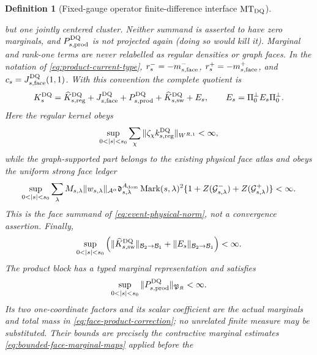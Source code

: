 \documentclass[11pt]{article}
\newtheorem{definition}[theorem]{Definition}
\newcommand{\cB}{\mathcal B}
\begin{document}
\begin{definition}[Fixed-gauge operator finite-difference interface
$\mathrm{MT}_{\rm DQ}$]
\begin{enumerate}[label=\textup{(MT\arabic*)}]
      but one jointly centered cluster.  Neither summand is asserted to have
      zero marginals, and $P_{s,\rm prod}^{\rm DQ}$ is not projected again
      (doing so would kill it).  Marginal and rank-one terms are never
      relabelled as regular densities or graph faces.  In the notation of
      \eqref{eq:product-current-type},
      $r_s^-=-m_{s,\rm face}^-$,
      $r_s^+=-m_{s,\rm face}^+$, and
      $c_s=J_{s,\rm face}^{\rm DQ}(1,1)$.  With this convention
      the complete quotient is
      \[
        K_s^{\rm DQ}=\widehat K_{s,\rm reg}^{\rm DQ}
          +J_{s,\rm face}^{\rm DQ}+P_{s,\rm prod}^{\rm DQ}
          +\widehat K_{s,\rm sw}^{\rm DQ}+E_s,
        \qquad E_s=\Pi_0^\perp E_s\Pi_0^\perp .
      \]
      Here the regular kernel obeys
      \begin{equation}
      \label{eq:uniform-gauge-DQ-regular}
       \sup_{0<|s|<s_0}\sum_\chi
       \|\zeta_\chi k_{s,\rm reg}^{\rm DQ}\|_{W^{R,1}}<\infty ,
      \end{equation}
      while the graph-supported part belongs to the existing physical face
      atlas and obeys the uniform strong face ledger
      \begin{equation}
      \label{eq:uniform-gauge-DQ-face}
       \sup_{0<|s|<s_0}\sum_{\lambda}M_{s,\lambda}
       \|w_{s,\lambda}\|_{\mathcal A^\alpha}
       \mathfrak d_{s,\lambda}^{A_{\rm dom}}
       \operatorname{Mark}(s,\lambda)^2
       \{1+Z(\mathcal G_{s,\lambda}^-)
              +Z(\mathcal G_{s,\lambda}^+)\}<\infty .
      \end{equation}
      This is the face summand of
      \eqref{eq:event-physical-norm}, not a convergence assertion.  Finally,
      \begin{equation}
      \label{eq:uniform-strong-weak-DQ}
       \sup_{0<|s|<s_0}
       \left(\|\widehat K_{s,\rm sw}^{\rm DQ}\|_{\cB_2\to\cB_1}
       +\|E_s\|_{\cB_2\to\cB_1}\right)<\infty.
      \end{equation}
      The product block has a typed marginal representation and satisfies
      \begin{equation}
      \label{eq:uniform-product-current-DQ}
       \sup_{0<|s|<s_0}
       \|P_{s,\rm prod}^{\rm DQ}\|_{\mathfrak P_R}<\infty.
      \end{equation}
      Its two one-coordinate factors and its scalar coefficient are the
      actual marginals and total mass in
      \eqref{eq:face-product-correction}; no unrelated finite measure may be
      substituted.  Their bounds are precisely the contractive marginal
      estimates \eqref{eq:bounded-face-marginal-maps} applied before the

\end{enumerate}
\end{definition}
\end{document}
